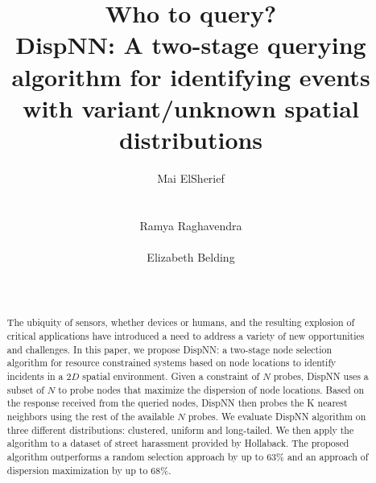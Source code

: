 \documentclass{acm_proc_article-sp}
\begin{document}
\title{Who to query? \\DispNN: A two-stage querying algorithm for identifying events with variant/unknown spatial distributions }
\author{
%
%
\alignauthor
Mai ElSherief\\
\\
\\
\alignauthor
Ramya Raghavendra\\
\\
\alignauthor
Elizabeth Belding\\
\\
\\
}
\maketitle
\begin{abstract}
The ubiquity of sensors, whether devices or humans, and the resulting explosion of critical applications have introduced
a need to address a variety of new opportunities and challenges. In this paper, we propose DispNN: a two-stage node selection algorithm for resource constrained systems based on node locations to identify incidents in a $2D$ spatial environment. Given a constraint of $N$ probes, DispNN uses a subset of $N$ to probe nodes that maximize the dispersion of node locations. Based on the response received from the queried nodes, DispNN then probes the K nearest neighbors using the rest of the available $N$ probes. We evaluate DispNN algorithm on three different distributions: clustered, uniform and long-tailed. We then apply the algorithm to a dataset of street harassment provided by Hollaback. The proposed algorithm outperforms a random selection approach by up to $63\%$ and an approach of dispersion maximization by up to $68\%$.
\end{abstract}
\end{document}
